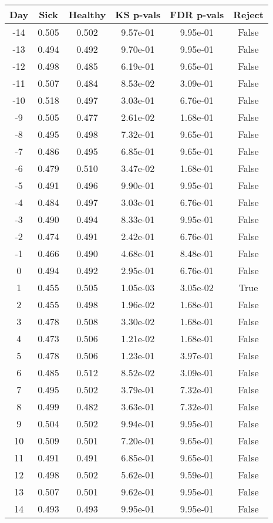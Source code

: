 \begin{tabular}{c|c|c|c|c|c}
Day &  Sick & Healthy &  KS p-vals & FDR p-vals & Reject\\
\hline
-14 & 0.505 &   0.502 &   9.57e-01 &   9.95e-01 &  False\\
-13 & 0.494 &   0.492 &   9.70e-01 &   9.95e-01 &  False\\
-12 & 0.498 &   0.485 &   6.19e-01 &   9.65e-01 &  False\\
-11 & 0.507 &   0.484 &   8.53e-02 &   3.09e-01 &  False\\
-10 & 0.518 &   0.497 &   3.03e-01 &   6.76e-01 &  False\\
 -9 & 0.505 &   0.477 &   2.61e-02 &   1.68e-01 &  False\\
 -8 & 0.495 &   0.498 &   7.32e-01 &   9.65e-01 &  False\\
 -7 & 0.486 &   0.495 &   6.85e-01 &   9.65e-01 &  False\\
 -6 & 0.479 &   0.510 &   3.47e-02 &   1.68e-01 &  False\\
 -5 & 0.491 &   0.496 &   9.90e-01 &   9.95e-01 &  False\\
 -4 & 0.484 &   0.497 &   3.03e-01 &   6.76e-01 &  False\\
 -3 & 0.490 &   0.494 &   8.33e-01 &   9.95e-01 &  False\\
 -2 & 0.474 &   0.491 &   2.42e-01 &   6.76e-01 &  False\\
 -1 & 0.466 &   0.490 &   4.68e-01 &   8.48e-01 &  False\\
  0 & 0.494 &   0.492 &   2.95e-01 &   6.76e-01 &  False\\
  1 & 0.455 &   0.505 &   1.05e-03 &   3.05e-02 &   True\\
  2 & 0.455 &   0.498 &   1.96e-02 &   1.68e-01 &  False\\
  3 & 0.478 &   0.508 &   3.30e-02 &   1.68e-01 &  False\\
  4 & 0.473 &   0.506 &   1.21e-02 &   1.68e-01 &  False\\
  5 & 0.478 &   0.506 &   1.23e-01 &   3.97e-01 &  False\\
  6 & 0.485 &   0.512 &   8.52e-02 &   3.09e-01 &  False\\
  7 & 0.495 &   0.502 &   3.79e-01 &   7.32e-01 &  False\\
  8 & 0.499 &   0.482 &   3.63e-01 &   7.32e-01 &  False\\
  9 & 0.504 &   0.502 &   9.94e-01 &   9.95e-01 &  False\\
 10 & 0.509 &   0.501 &   7.20e-01 &   9.65e-01 &  False\\
 11 & 0.491 &   0.491 &   6.85e-01 &   9.65e-01 &  False\\
 12 & 0.498 &   0.502 &   5.62e-01 &   9.59e-01 &  False\\
 13 & 0.507 &   0.501 &   9.62e-01 &   9.95e-01 &  False\\
 14 & 0.493 &   0.493 &   9.95e-01 &   9.95e-01 &  False\\
\end{tabular}